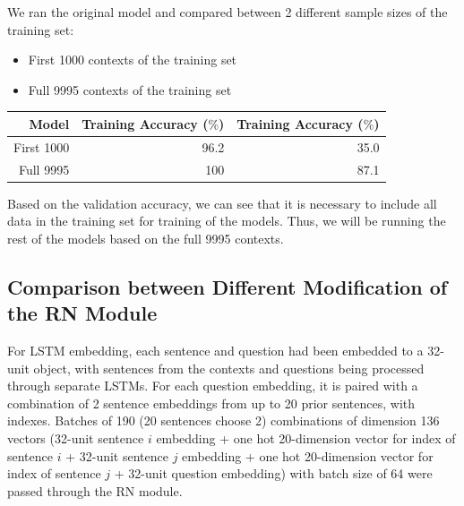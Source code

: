 \documentclass{article}
\begin{document}
 

 

We ran the original model and compared between 2 different sample sizes of the training set:

 

\begin{itemize}

\item  First 1000 contexts of the training set

\item Full 9995 contexts of the training set

\end{itemize}

 

\begin{center}

\begin{tabular}{|r|r|r|}

 

\hline

\textbf{Model}&\textbf{Training Accuracy ($\%$)}&\textbf{Training Accuracy ($\%$)}\\

\hline

First 1000 & 96.2 & 35.0\\

\hline

Full 9995 & 100 & 87.1\\

\hline

 

\end{tabular}

\end{center}

 

Based on the validation accuracy, we can see that it is necessary to include all data in the training set for training of the models. Thus, we will be running the rest of the models based on the full 9995 contexts.

 

 

\subsection{Comparison between Different Modification of the RN Module}

 

For LSTM embedding, each sentence and question had been embedded to a 32-unit object, with sentences from the contexts and questions being processed through separate LSTMs. For each question embedding, it is paired with a combination of 2 sentence embeddings from up to 20 prior sentences, with indexes. Batches of 190 (20 sentences choose 2) combinations of dimension 136 vectors (32-unit sentence $i$ embedding + one hot 20-dimension vector for index of sentence $i$ + 32-unit sentence $j$ embedding + one hot 20-dimension vector for index of sentence $j$ + 32-unit question embedding) with batch size of 64 were passed through the RN module.
\end{document}
